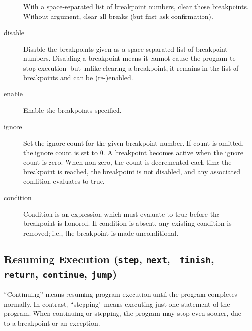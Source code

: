 \begin{description}
With a space-separated list of breakpoint numbers, clear those
breakpoints.  Without argument, clear all breaks (but first
ask confirmation).

\item[disable \optional{\var{bpnumber} \optional{\var{bpnumber \ldots}}}]

Disable the breakpoints given as a space-separated list of
breakpoint numbers.  Disabling a breakpoint means it cannot cause
the program to stop execution, but unlike clearing a breakpoint, it
remains in the list of breakpoints and can be (re-)enabled.

\item[enable \optional{\var{bpnumber} \optional{\var{bpnumber \ldots}}}]

Enable the breakpoints specified.

\item[ignore \var{bpnumber} \optional{\var{count}}]

Set the ignore count for the given breakpoint number.  If count is
omitted, the ignore count is set to 0.  A breakpoint becomes active
when the ignore count is zero.  When non-zero, the count is
decremented each time the breakpoint is reached, the breakpoint is not
disabled, and any associated condition evaluates to true.

\item[condition \var{bpnumber} \optional{\var{condition}}]

Condition is an expression which must evaluate to true before
the breakpoint is honored.  If condition is absent, any existing
condition is removed; i.e., the breakpoint is made unconditional.

\end{description}

\subsection{Resuming Execution ({\tt step}, {\tt next}, {\tt
    finish}, {\tt return}, {\tt continue}, {\tt jump})\label{subsubsection-resume}}

``Continuing'' means resuming program execution until the program
completes normally.  In contrast, ``stepping'' means executing just
one statement of the program. When continuing or stepping, the program may stop even sooner, due to a breakpoint or an
exception.

